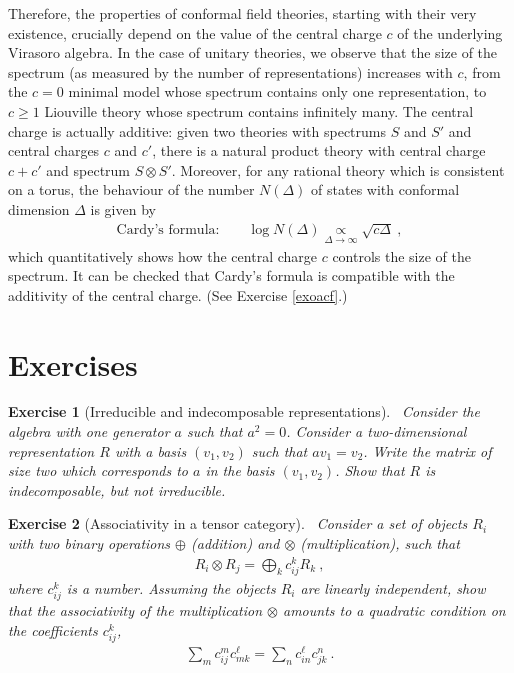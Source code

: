\documentclass[12pt,a4paper,notitlepage]{report}
\numberwithin{equation}{section}
\theoremstyle{break}
\newtheorem{exo}{Exercise}[chapter]
\begin{document}
Therefore,
the properties of conformal field theories, starting with their very existence, crucially depend on the value of the central charge $c$ of the underlying Virasoro algebra. In the case of unitary theories, we observe that the size of the spectrum (as measured by the number of representations) increases with $c$, from the $c=0$ minimal model whose spectrum contains only one representation, to $c\geq 1$ Liouville theory whose spectrum contains infinitely many. The central charge is actually additive: given two theories with spectrums $S$ and $S'$ and central charges $c$ and $c'$, there is a natural product theory with central charge $c+c'$ and spectrum $S\otimes S'$. Moreover, for any rational theory which is consistent on a torus, 
the behaviour of the number $N(\Delta)$ of states with conformal dimension $\Delta$ is given by 
\begin{align}
\text{Cardy's formula:} \qquad \log N(\Delta) \underset{\Delta\rightarrow \infty}{\propto} \sqrt{c \Delta} \ ,
\label{nds}
\end{align}
which quantitatively shows how the central charge $c$ controls the size of the spectrum.
It can be checked that Cardy's formula is compatible with the additivity of the central charge. (See Exercise \ref{exoacf}.)

\section{Exercises}


\begin{exo}[Irreducible and indecomposable representations] 
~\label{exoirr}
Consider the algebra with one generator $a$ such that $a^2 = 0$. Consider a two-dimensional representation $R$ with a basis $(v_1,v_2)$ such that $av_1=v_2$. Write the matrix of size two which corresponds to $a$ in the basis $(v_1,v_2)$. Show that $R$ is indecomposable, but not irreducible. 
\end{exo}

\begin{exo}[Associativity in a tensor category]
 ~\label{exoten}
Consider a set of objects $R_i$ with two binary operations $\oplus$ (addition) and $\otimes$ (multiplication), such that 
\begin{align}
 R_i \otimes R_j = \bigoplus_k c_{ij}^k R_k\ ,
\end{align}
where $c_{ij}^k$ is a number. Assuming the objects $R_i$ are linearly independent, show that the associativity of the multiplication $\otimes$ amounts to a quadratic condition on the coefficients $c_{ij}^k$,
\begin{align}
 \sum_m c_{ij}^m c_{mk}^\ell = \sum_n c_{in}^\ell c_{jk}^n\ .
\end{align}
\end{exo}
\end{document}
